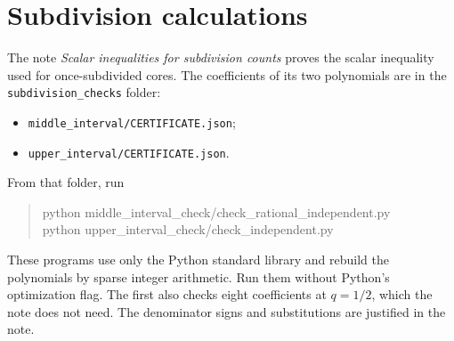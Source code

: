 \documentclass[11pt]{article}
\newcommand{\file}[1]{\nolinkurl{#1}}
\begin{document}
\section{Subdivision calculations}
The note \emph{Scalar inequalities for subdivision counts} proves the scalar inequality used for once-subdivided cores. The coefficients of its two polynomials are in the \file{subdivision_checks} folder:
\begin{itemize}
\item \file{middle_interval/CERTIFICATE.json};
\item \file{upper_interval/CERTIFICATE.json}.
\end{itemize}
From that folder, run
\begin{quote}\ttfamily\small
python middle\_interval\_check/check\_rational\_independent.py\\
python upper\_interval\_check/check\_independent.py
\end{quote}
These programs use only the Python standard library and rebuild the polynomials by sparse integer arithmetic. Run them without Python's optimization flag. The first also checks eight coefficients at $q=1/2$, which the note does not need. The denominator signs and substitutions are justified in the note.
\end{document}

